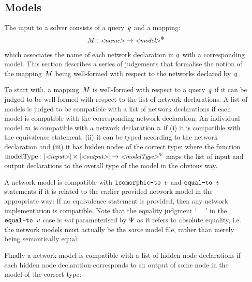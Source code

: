 \subsection{Models}
\label{sec:model-typing}

The input to a solver consists of a query~$q$ and a mapping:
\begin{equation*}
    M : \text{\small \textit{<name>}} \rightarrow \text{\small \textit{<model>}}^\Psi
\end{equation*}
which associates the name of each network declaration in $q$ with a corresponding model. 
This section describes a series of judgements that formalise the notion of the mapping~$M$ being well-formed with respect to the networks declared by~$q$. 

To start with, a mapping~$M$ is well-formed with respect to a query~$q$ if it can be judged to be well-formed with respect to the list of network declarations. 
\unskip
A list of models is judged to be compatible with a list of network declarations if each model is compatible with the corresponding network declaration:
\unskip
An individual model $m$ is compatible with a network declaration $n$ if (i) it is compatible with the equivalence statement, (ii) it can be typed according to the network declaration and (iii) it has hidden nodes of the correct type: 
\unskip
where the function $\text{modelType} : [\text{\small \textit{<input>}}] \times [\text{\small \textit{<output>}}] \rightarrow \text{\small \textit{<modelType>}}^\Psi$ maps the list of input and output declarations to the overall type of the model in the obvious way.

A network model is compatible with $\texttt{isomorphic-to }v$ and $\texttt{equal-to }v$ statements if it is related to the earlier provided network model in the appropriate way:
\unskip
If no equivalence statement is provided, then any network implementation is compatible. Note that the equality judgment `$=$' in the $\texttt{equal-to }v$ case is \emph{not} parameterised by $\Psi$ as it refers to absolute equality, i.e. the network models must actually be the \emph{same} model file, rather than merely being semantically equal. 

Finally a network model is compatible with a list of hidden node declarations if each hidden node declaration corresponds to an output of some node in the model of the correct type:
\unskip


